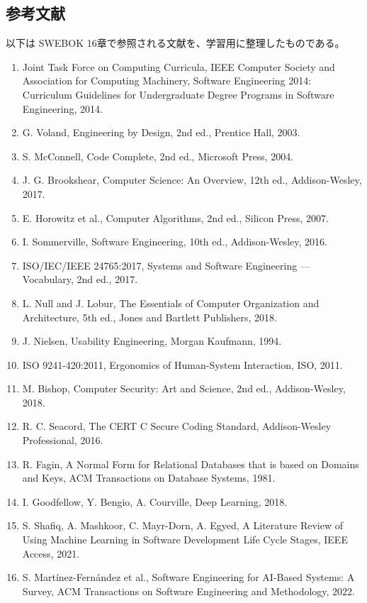 \subsection{参考文献}

以下は SWEBOK 16章で参照される文献を、学習用に整理したものである。

\begin{enumerate}[leftmargin=2em]
\item Joint Task Force on Computing Curricula, IEEE Computer Society and Association for Computing Machinery, Software Engineering 2014: Curriculum Guidelines for Undergraduate Degree Programs in Software Engineering, 2014.
\item G. Voland, Engineering by Design, 2nd ed., Prentice Hall, 2003.
\item S. McConnell, Code Complete, 2nd ed., Microsoft Press, 2004.
\item J. G. Brookshear, Computer Science: An Overview, 12th ed., Addison-Wesley, 2017.
\item E. Horowitz et al., Computer Algorithms, 2nd ed., Silicon Press, 2007.
\item I. Sommerville, Software Engineering, 10th ed., Addison-Wesley, 2016.
\item ISO/IEC/IEEE 24765:2017, Systems and Software Engineering — Vocabulary, 2nd ed., 2017.
\item L. Null and J. Lobur, The Essentials of Computer Organization and Architecture, 5th ed., Jones and Bartlett Publishers, 2018.
\item J. Nielsen, Usability Engineering, Morgan Kaufmann, 1994.
\item ISO 9241-420:2011, Ergonomics of Human-System Interaction, ISO, 2011.
\item M. Bishop, Computer Security: Art and Science, 2nd ed., Addison-Wesley, 2018.
\item R. C. Seacord, The CERT C Secure Coding Standard, Addison-Wesley Professional, 2016.
\item R. Fagin, A Normal Form for Relational Databases that is based on Domains and Keys, ACM Transactions on Database Systems, 1981.
\item I. Goodfellow, Y. Bengio, A. Courville, Deep Learning, 2018.
\item S. Shafiq, A. Mashkoor, C. Mayr-Dorn, A. Egyed, A Literature Review of Using Machine Learning in Software Development Life Cycle Stages, IEEE Access, 2021.
\item S. Martínez-Fernández et al., Software Engineering for AI-Based Systems: A Survey, ACM Transactions on Software Engineering and Methodology, 2022.

\end{enumerate}
